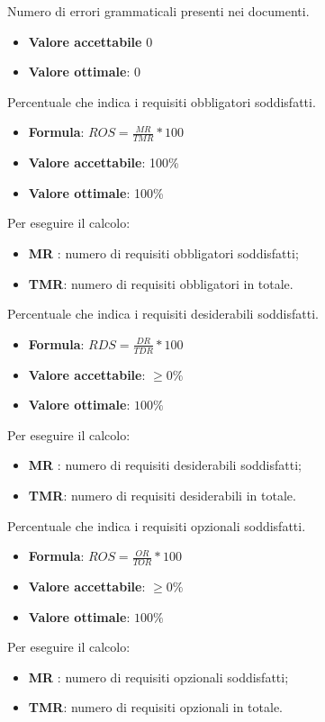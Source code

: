 Numero di errori grammaticali presenti nei documenti.
\begin{itemize}
    \item \textbf{Valore accettabile} $0$
    \item \textbf{Valore ottimale}: $0$
\end{itemize}  

Percentuale che indica i requisiti obbligatori soddisfatti.
\begin{itemize}
    \item \textbf{Formula}: $ROS=\frac{MR}{TMR}*100$
    \item \textbf{Valore accettabile}: 100\%
    \item \textbf{Valore ottimale}: 100\%
\end{itemize}
Per eseguire il calcolo:
\begin{itemize}
    \item \textbf{MR} : numero di requisiti obbligatori soddisfatti;
    \item \textbf{TMR}: numero di requisiti obbligatori in totale.
\end{itemize} 

Percentuale che indica i requisiti desiderabili soddisfatti.
\begin{itemize}
    \item \textbf{Formula}: $RDS=\frac{DR}{TDR}*100$
    \item \textbf{Valore accettabile}: $\geq0\%$
    \item \textbf{Valore ottimale}: $100\%$
\end{itemize}  
Per eseguire il calcolo:
\begin{itemize}
    \item \textbf{MR} : numero di requisiti desiderabili soddisfatti;
    \item \textbf{TMR}: numero di requisiti desiderabili in totale.
\end{itemize} 


Percentuale che indica i requisiti opzionali soddisfatti.
\begin{itemize}
    \item \textbf{Formula}: $ROS=\frac{OR}{TOR}*100$
    \item \textbf{Valore accettabile}: $\geq0\%$
    \item \textbf{Valore ottimale}: $100\%$
\end{itemize}  
Per eseguire il calcolo:
\begin{itemize}
    \item \textbf{MR} : numero di requisiti opzionali soddisfatti;
    \item \textbf{TMR}: numero di requisiti opzionali in totale.
\end{itemize} 

